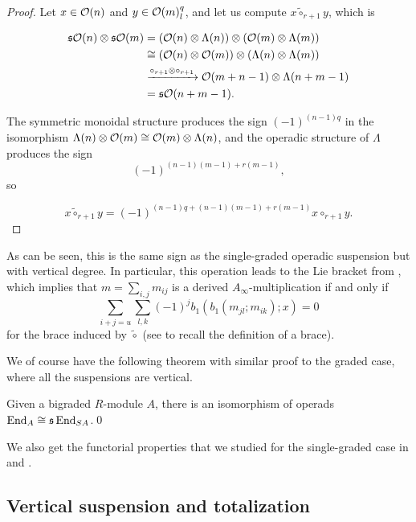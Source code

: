 \documentclass[Thesis.tex]{subfiles}
\begin{document}
\begin{proof}
Let $x\in{\mathcal O}(n)$ and $y\in{\mathcal O}(m)^{q}_l$, and let us compute $x\tilde{\circ}_{r+1} y$, which is

\begin{align*}
\mathfrak{s}{\mathcal O}(n)\otimes\mathfrak{s}{\mathcal O}(m)&=({\mathcal O}(n)\otimes\Lambda(n))\otimes ({\mathcal O}(m)\otimes\Lambda(m))\\
&\cong ({\mathcal O}(n)\otimes {\mathcal O}(m))\otimes (\Lambda(n)\otimes \Lambda(m))\\
&\xrightarrow{\circ_{r+1}\otimes\circ_{r+1}} {\mathcal O}(m+n-1)\otimes \Lambda(n+m-1)\\
&=\mathfrak{s}{\mathcal O}(n+m-1).
\end{align*}

The symmetric monoidal structure produces the sign $(-1)^{(n-1)q}$ in the isomorphism $\Lambda(n)\otimes {\mathcal O}(m)\cong{\mathcal O}(m)\otimes\Lambda(n)$, and the operadic structure of $\Lambda$ produces the sign \[(-1)^{(n-1)(m-1)+r(m-1)},\] so 

\[
x\tilde{\circ}_{r+1}y=(-1)^{(n-1)q+(n-1)(m-1)+r(m-1)}x\circ_{r+1} y.
\]

\end{proof}


\begin{remark}
As can be seen, this is the same sign as the single-graded operadic suspension but with vertical degree. In particular, this operation leads to the Lie bracket from \cite{RW}, which implies that $m=\sum_{i,j}m_{ij}$ is a derived $A_\infty$-multiplication if and only if
\begin{equation}\label{sharp}
\sum_{i+j=u}\sum_{l,k}(-1)^jb_1(b_1(m_{jl};m_{ik});x)=0
\end{equation}
for the brace induced by $\tilde{\circ}$ (see  to recall the definition of a brace).
\end{remark}

We of course have the following theorem with similar proof to the graded case, where all the suspensions are vertical.
\begin{thm}
Given a bigraded $R$-module $A$, there is an isomorphism of operads $\operatorname{End}_{ A}\cong \mathfrak{s}\operatorname{End}_{SA}$.\qed
\end{thm}

We also get the functorial properties that we studied for the single-graded case in  and .

\subsection{Vertical suspension and totalization} 
\end{document}
